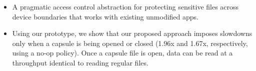 \begin{itemize}

\item A pragmatic access control abstraction for protecting sensitive files
  across device boundaries that works with existing unmodified apps.

\item Using our prototype, we show that our proposed approach imposes slowdowns
  only when a capsule is being opened or closed (1.96x and 1.67x, respectively,
  using a no-op policy). Once a capsule file is open, data can be read at a
  throughput identical to reading regular files.

\end{itemize}


\endinput

Any text after an \endinput is ignored.
You could put scraps here or things in progress.
